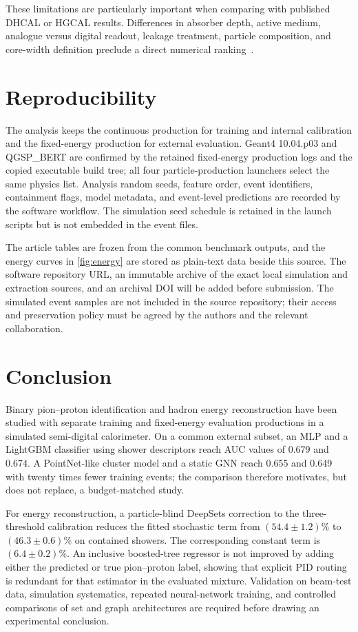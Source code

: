 \documentclass[11pt,a4paper]{article}
\begin{document}
These limitations are particularly important when comparing with published DHCAL or
HGCAL results. Differences in absorber depth, active medium, analogue versus digital
readout, leakage treatment, particle composition, and core-width definition preclude
a direct numerical ranking~\cite{borysova2025dhcalgnn,aamir2024hgcalgnn}.

\section{Reproducibility}
\label{sec:reproducibility}

The analysis keeps the continuous production for training and internal calibration
and the fixed-energy production for external evaluation. Geant4 10.04.p03 and
QGSP\_BERT are confirmed by the retained fixed-energy production logs and the copied
executable build tree; all four particle-production launchers select the same physics
list. Analysis random seeds, feature order, event identifiers, containment flags,
model metadata, and event-level predictions are recorded by the software workflow.
The simulation seed schedule is retained in the launch scripts but is not embedded in
the event files.

The article tables are frozen from the common benchmark outputs, and the energy curves
in \cref{fig:energy} are stored as plain-text data beside this source. The software
repository URL, an immutable archive of the exact local simulation and extraction
sources, and an archival DOI will be added before submission. The simulated event
samples are not included in the source repository; their access and preservation
policy must be agreed by the authors and the relevant collaboration.

\section{Conclusion}
\label{sec:conclusion}

Binary pion--proton identification and hadron energy reconstruction have been studied
with separate training and fixed-energy evaluation productions in a simulated
semi-digital calorimeter. On a common external subset, an MLP and a LightGBM classifier
using shower descriptors reach AUC values of 0.679 and 0.674. A PointNet-like cluster
model and a static GNN reach 0.655 and 0.649 with twenty times fewer training events;
the comparison therefore motivates, but does not replace, a budget-matched study.

For energy reconstruction, a particle-blind DeepSets correction to the three-threshold
calibration reduces the fitted stochastic term from $(54.4\pm1.2)\%$ to
$(46.3\pm0.6)\%$ on contained showers. The corresponding constant term is
$(6.4\pm0.2)\%$. An inclusive boosted-tree regressor is not improved by adding either
the predicted or true pion--proton label, showing that explicit PID routing is
redundant for that estimator in the evaluated mixture. Validation on beam-test data,
simulation systematics, repeated neural-network training, and controlled comparisons
of set and graph architectures are required before drawing an experimental conclusion.
\end{document}
